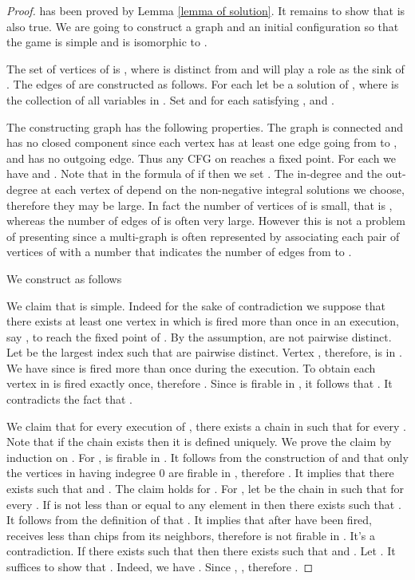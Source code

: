 \documentclass{article}
\theoremstyle{definition}
\begin{document}
\begin{proof}
 has been proved by Lemma \ref{lemma of solution}. It remains to show that  is also true. We are going to construct a graph  and an initial configuration  so that the game is simple and  is isomorphic to .

The set of vertices of  is , where  is distinct from  and will play a role as the sink of . The edges of  are constructed as follows. For each  let  be a solution of , where  is the collection of all variables in . Set  and for each  satisfying , and .

The constructing graph  has the following properties. The graph  is connected and has no closed component since each vertex  has at least one edge going from  to , and  has no outgoing edge. Thus any CFG on  reaches a fixed point. For each  we have  and . Note that in the formula of  if  then we set . The in-degree and the out-degree at each  vertex of  depend on the non-negative integral solutions  we choose, therefore they may be large. In fact the number of vertices of  is small, that is , whereas the number of edges of  is often very large. However this is not a problem of presenting  since a multi-graph is often represented by associating each pair  of vertices of  with a number that indicates the number of edges from  to .

We construct  as follows


We claim that  is simple. Indeed for the sake of contradiction we suppose that there exists at least one vertex in  which is fired more than once in an execution, say , to reach the fixed point  of . By the assumption,  are not pairwise distinct. Let  be the largest index such that  are pairwise distinct. Vertex , therefore, is in . We have  since  is fired more than once during the execution. To obtain  each vertex in  is fired exactly once, therefore . Since  is firable in , it follows that . It contradicts the fact that .

We claim that for every execution  of , there exists a chain  in  such that  for every . Note that if the chain exists then it is defined uniquely. We prove the claim by induction on . For ,  is firable in . It follows from the construction of  and  that only the vertices in  having indegree 0 are firable in , therefore . It implies that there exists  such that  and . The claim holds for . For , let  be the chain in  such that  for every . If  is not less than or equal to any element in  then there exists  such that . It follows from the definition of  that . It implies that after  have been fired,  receives less than  chips from its neighbors, therefore  is not firable in . It's a contradiction. If there exists  such that  then there exists  such that  and . Let . It suffices to show that . Indeed, we have . Since , , therefore .


\end{proof}
\end{document}
